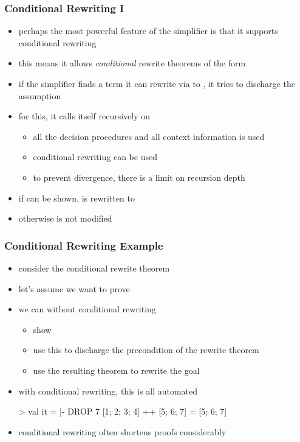 \begin{frame}[fragile]
\frametitle{Conditional Rewriting I}

\begin{itemize}
\item perhaps the most powerful feature of the simplifier is that it supports conditional rewriting
\item this means it allows \emph{conditional} rewrite theorems of the form\\
\item if the simplifier finds a term  it can rewrite via  to , it tries to discharge the assumption 
\item for this, it calls itself recursively on 
\begin{itemize}
\item all the decision procedures and all context information is used
\item conditional rewriting can be used
\item to prevent divergence, there is a limit on recursion depth
\end{itemize}
\item if  can be shown,  is rewritten to 
\item otherwise  is not modified
\end{itemize}
\end{frame}

\begin{frame}[fragile]
\frametitle{Conditional Rewriting Example}

\begin{itemize}
\item consider the conditional rewrite theorem \\
\item let's assume we want to prove \\
\item we can without conditional rewriting
\begin{itemize}
\item show 
\item use this to discharge the precondition of the rewrite theorem
\item use the resulting theorem to rewrite the goal
\end{itemize}
\item with conditional rewriting, this is all automated
\begin{semiverbatim}
> 
val it = |- DROP 7 [1; 2; 3; 4] ++ [5; 6; 7] = [5; 6; 7]
\end{semiverbatim}
\item conditional rewriting often shortens proofs considerably
\end{itemize}

\end{frame}

